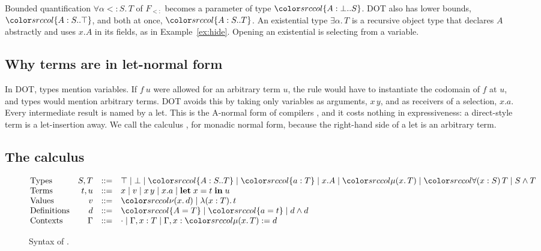 Bounded quantification $\forall \alpha <: S.\,T$ of $F_{<:}$ becomes a parameter of type $\dtyp{A}{\bot}{S}$. DOT also has lower bounds, $\dtyp{A}{S}{\top}$, and both at once, $\dtyp{A}{S}{T}$. An existential type $\exists \alpha.\,T$ is a recursive object type that declares $A$ abstractly and uses $x.A$ in its fields, as in Example~\ref{ex:hide}. Opening an existential is selecting from a variable.

\subsection{Why terms are in let-normal form}

In DOT, types mention variables. If $f\ u$ were allowed for an arbitrary term $u$, the rule  would have to instantiate the codomain of $f$ at $u$, and types would mention arbitrary terms. DOT avoids this by taking only variables as arguments, $x\,y$, and as receivers of a selection, $x.a$. Every intermediate result is named by a let. This is the A-normal form of compilers \cite{flanagan1993essence}, and it costs nothing in expressiveness: a direct-style term is a let-insertion away. We call the calculus \DOTMNF, for monadic normal form, because the right-hand side of a let is an arbitrary term.

\subsection{The calculus}

\begin{figure}
\small
\color{srccol}
\[
\begin{array}{@{}lrcl@{}}
\text{Types} & S,T & ::= & \top \mid \bot \mid \dtyp{A}{S}{T} \mid \dfld{a}{T} \mid x.A \mid \dmu{x}{T} \mid \dall{x}{S}{T} \mid S \wedge T \\
\text{Terms} & t,u & ::= & x \mid v \mid x\,y \mid x.a \mid \klet x = t \kin u \\
\text{Values} & v & ::= & \dnew{x}{d} \mid \lambda(x : T).\,t \\
\text{Definitions} & d & ::= & \ddeftyp{A}{T} \mid \ddeftrm{a}{t} \mid d \wedge d \\
\text{Contexts} & \Gamma & ::= & \cdot \mid \Gamma, x : T \mid \Gamma, x : \dmu{x}{T} \mathrel{:=} d
\end{array}
\]
\color{black}
\caption{Syntax of \DOTMNF.}
\label{fig:source-syntax}
\end{figure}

